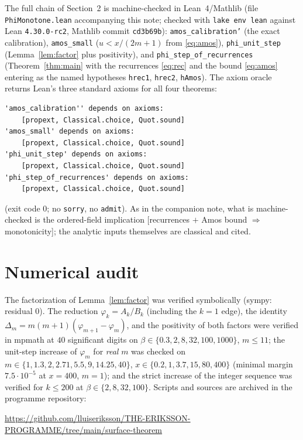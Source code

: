 \documentclass[11pt]{article}
\theoremstyle{remark}
\begin{document}
The full chain of Section~2 is machine-checked in Lean~4/Mathlib
(file \texttt{PhiMonotone.lean} accompanying this note; checked with
\texttt{lake env lean} against Lean \texttt{4.30.0-rc2}, Mathlib
commit \texttt{cd3b69b}): \texttt{amos\_calibration'} (the exact
calibration), \texttt{amos\_small} ($u < x/(2m+1)$ from
\eqref{eq:amos}), \texttt{phi\_unit\_step}
(Lemma~\ref{lem:factor} plus positivity), and
\texttt{phi\_step\_of\_recurrences} (Theorem~\ref{thm:main} with the
recurrences \eqref{eq:rec} and the bound \eqref{eq:amos} entering as
the named hypotheses \texttt{hrec1}, \texttt{hrec2},
\texttt{hAmos}). The axiom oracle returns Lean's three standard
axioms for all four theorems:
\begin{verbatim}
'amos_calibration'' depends on axioms:
    [propext, Classical.choice, Quot.sound]
'amos_small' depends on axioms:
    [propext, Classical.choice, Quot.sound]
'phi_unit_step' depends on axioms:
    [propext, Classical.choice, Quot.sound]
'phi_step_of_recurrences' depends on axioms:
    [propext, Classical.choice, Quot.sound]
\end{verbatim}
(exit code $0$; no \texttt{sorry}, no \texttt{admit}). As in the
companion note, what is machine-checked is the ordered-field
implication [recurrences $+$ Amos bound $\Rightarrow$ monotonicity];
the analytic inputs themselves are classical and cited.

\section{Numerical audit}

The factorization of Lemma~\ref{lem:factor} was verified symbolically
(sympy: residual $0$). The reduction $\varphi_k = A_k/B_k$ (including
the $k=1$ edge), the identity
$\Delta_m = m(m+1)(\varphi_{m+1}-\varphi_m)$, and the positivity of
both factors were verified in mpmath at $40$ significant digits on
$\beta \in \{0.3, 2, 8, 32, 100, 1000\}$, $m \le 11$; the unit-step
increase of $\varphi_m$ for \emph{real} $m$ was checked on
$m \in \{1, 1.3, 2, 2.71, 5.5, 9, 14.25, 40\}$,
$x \in \{0.2, 1, 3.7, 15, 80, 400\}$ (minimal margin
$7.5\cdot10^{-5}$ at $x=400$, $m=1$); and the strict increase of the
integer sequence was verified for $k \le 200$ at
$\beta \in \{2, 8, 32, 100\}$. Scripts and sources are archived in
the programme repository:
\begin{center}\small
\url{https://github.com/lluiseriksson/THE-ERIKSSON-PROGRAMME/tree/main/surface-theorem}
\end{center}
\end{document}
